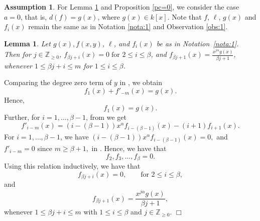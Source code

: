 \documentclass[12pt,reqno]{amsart}
\renewcommand{\leq}{\leqslant}
\renewcommand{\geq}{\geqslant}
\numberwithin{thm}{section}
\newtheorem{lem}[thm]{Lemma}
\theoremstyle{definition}
\newtheorem{assume}[thm]{Assumption}
\numberwithin{equation}{thm}
\renewenvironment{proof}{\par\noindent {\em Proof:}}{\hfill$\Box$\medskip}
\theoremstyle{plain}
\begin{document}
\begin{assume}
For Lemma \ref{fval} and Proposition \ref{pc=0}, we consider the case $a=0$, that is, 
$d(f)=g(x)$, where $g(x)\in k[x]$. Note that $f$, $\ell$, $g(x)$ and $f_i(x)$ remain the same as in Notation \ref{nota:1} and Observation \ref{obs:1}.
\end{assume}
\begin{lem}\label{fval}
Let $g(x),f(x,y)$, $\ell$, and $f_i(x)$ be as in Notation~\ref{nota:1}. Then for $j \in \mathbb{Z}_{\geq 0}$, $f_{\beta j + i}(x) = 0\;\text{for } 2 \leq i \leq \beta$, and $f_{\beta j + 1}(x) = \frac{x^{j\alpha} g(x)}{\beta j + 1}$,
whenever $1 \leq \beta j + i \leq m$ for $1 \leq i \leq \beta$.
\end{lem}
\begin{proof}
Comparing the degree zero term of $y$ in , we obtain
\begin{equation}\label{eq2:1}
f_1(x)+f'_{-m}(x)=g(x) .
\end{equation}
Hence, $$f_1(x)=g(x).$$
Further, for $i=1,\dots ,\beta-1$, from  we get
\begin{equation}\label{eq2:3}
f'_{i-m}(x)=(i-(\beta-1))x^\alpha f_{i-(\beta-1)}(x)-(i+1)f_{i+1}(x).
\end{equation}
For $i=1,\dots,\beta-1$, we have $(i-(\beta-1))x^\alpha f_{i-(\beta-1)}(x)=0,$ and $f'_{i-m}=0$ since $m\geq \beta+1,$ in . Hence, we have that $$f_2,f_3,\dots,f_\beta=0.$$
Using this relation inductively, we have that
$$f_{\beta j + i}(x) = 0, \qquad \text{for } 2 \leq i \leq \beta,$$
and
$$f_{\beta j+1}(x) = \frac{x^{j\alpha}g(x)}{\beta j+1},$$
whenever $1\leq\beta j+i\leq m$ with $1\leq i\leq\beta$ and $j\in\mathbb{Z}_{\geq0}$.
\end{proof}
\end{document}
